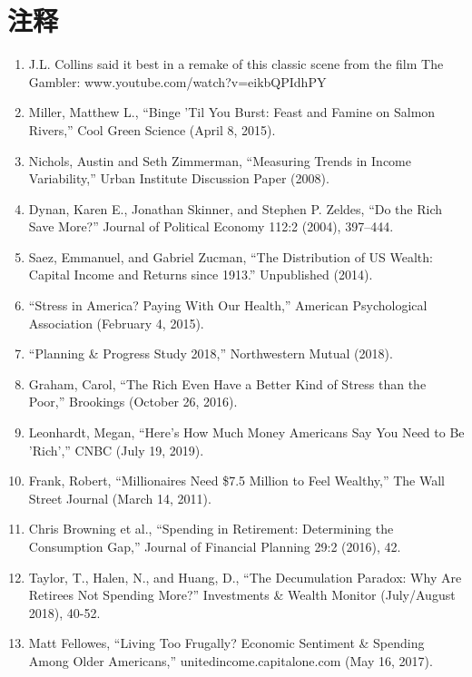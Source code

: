 \section{注释}

\begin{enumerate}
\item\hypertarget{endnote:1}{} J.L. Collins said it best in a remake of this classic scene from the film The Gambler: www.youtube.com/watch?v=eikbQPIdhPY
\item\hypertarget{endnote:2}{} Miller, Matthew L., “Binge 'Til You Burst: Feast and Famine on Salmon Rivers,” Cool Green Science (April 8, 2015).
\item\hypertarget{endnote:3}{} Nichols, Austin and Seth Zimmerman, “Measuring Trends in Income Variability,” Urban Institute Discussion Paper (2008).
\item\hypertarget{endnote:4}{} Dynan, Karen E., Jonathan Skinner, and Stephen P. Zeldes, “Do the Rich Save More?” Journal of Political Economy 112:2 (2004), 397–444.
\item\hypertarget{endnote:5}{} Saez, Emmanuel, and Gabriel Zucman, “The Distribution of US Wealth: Capital Income and Returns since 1913.” Unpublished (2014).
\item\hypertarget{endnote:6}{} “Stress in America? Paying With Our Health,” American Psychological Association (February 4, 2015).
\item\hypertarget{endnote:7}{} “Planning \& Progress Study 2018,” Northwestern Mutual (2018).
\item\hypertarget{endnote:8}{} Graham, Carol, “The Rich Even Have a Better Kind of Stress than the Poor,” Brookings (October 26, 2016).
\item\hypertarget{endnote:9}{} Leonhardt, Megan, “Here's How Much Money Americans Say You Need to Be 'Rich',” CNBC (July 19, 2019).
\item\hypertarget{endnote:10}{} Frank, Robert, “Millionaires Need \$7.5 Million to Feel Wealthy,” The Wall Street Journal (March 14, 2011).
\item\hypertarget{endnote:11}{} Chris Browning et al., “Spending in Retirement: Determining the Consumption Gap,” Journal of Financial Planning 29:2 (2016), 42.
\item\hypertarget{endnote:12}{} Taylor, T., Halen, N., and Huang, D., “The Decumulation Paradox: Why Are Retirees Not Spending More?” Investments \& Wealth Monitor (July/August 2018), 40-52.
\item\hypertarget{endnote:13}{} Matt Fellowes, “Living Too Frugally? Economic Sentiment \& Spending Among Older Americans,” unitedincome.capitalone.com (May 16, 2017).

\end{enumerate}
